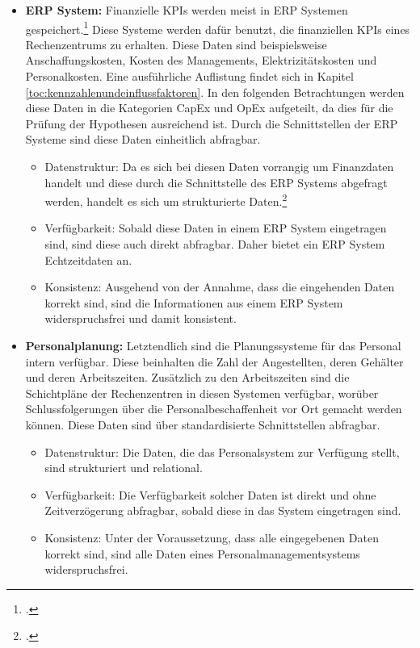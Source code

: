 \begin{itemize}
\begin{itemize}
    \end{itemize}
    \item \textbf{ERP System: }Finanzielle \acp{KPI} werden meist in \ac{ERP} Systemen
    gespeichert.\footcite[Cf.][Tabelle 3]{spathis2003usefulness} Diese Systeme werden dafür benutzt, die finanziellen \acp{KPI}
    eines Rechenzentrums zu erhalten. Diese Daten sind beispielsweise Anschaffungskosten, Kosten des Managements,
    Elektrizitätskosten und Personalkosten. Eine ausführliche Auflistung findet sich in
    Kapitel \ref{toc:kennzahlenundeinflussfaktoren}. In den folgenden Betrachtungen werden diese Daten in die Kategorien
    \ac{CapEx} und \ac{OpEx} aufgeteilt, da dies für die Prüfung der Hypothesen ausreichend ist. Durch die Schnittstellen
    der ERP Systeme sind diese Daten einheitlich abfragbar.
    \begin{itemize}
        \item Datenstruktur: Da es sich bei diesen Daten vorrangig um Finanzdaten handelt und diese durch die Schnittstelle
        des ERP Systems abgefragt werden, handelt es sich um strukturierte Daten.\footcite[Cf.][p. 27]{kimble2015big}
        \item Verfügbarkeit: Sobald diese Daten in einem \ac{ERP} System eingetragen sind, sind diese auch direkt abfragbar.
        Daher bietet ein \ac{ERP} System Echtzeitdaten an.
        \item Konsistenz: Ausgehend von der Annahme, dass die eingehenden Daten korrekt sind, sind die Informationen aus
        einem \ac{ERP} System widerspruchsfrei und damit konsistent.
    \end{itemize}
    \item \textbf{Personalplanung: }Letztendlich sind die Planungssysteme für das Personal intern verfügbar. Diese
    beinhalten die Zahl der Angestellten, deren Gehälter und deren Arbeitszeiten. Zusätzlich zu den Arbeitszeiten sind die
    Schichtpläne der Rechenzentren in diesen Systemen verfügbar, worüber Schlussfolgerungen über die Personalbeschaffenheit
    vor Ort gemacht werden können. Diese Daten sind über standardisierte Schnittstellen abfragbar.
    \begin{itemize}
        \item Datenstruktur: Die Daten, die das Personalsystem zur Verfügung stellt, sind strukturiert und relational.
        \item Verfügbarkeit: Die Verfügbarkeit solcher Daten ist direkt und ohne Zeitverzögerung abfragbar, sobald diese in
        das System eingetragen sind.
        \item Konsistenz: Unter der Voraussetzung, dass alle eingegebenen Daten korrekt sind, sind alle Daten eines
        Personalmanagementsystems widerspruchsfrei.
    \end{itemize}
\end{itemize}

